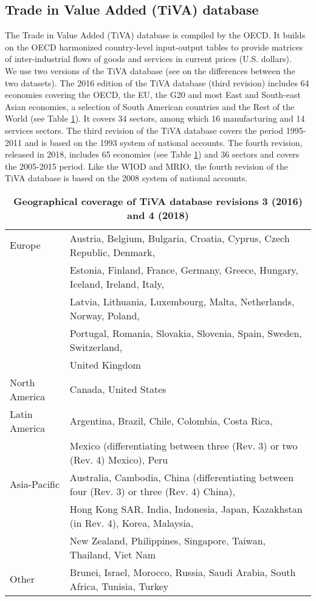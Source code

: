 \documentclass[11pt,a4paper]{paper} %
\begin{document}
\subsection{Trade in Value Added (TiVA) database}
The Trade in Value Added (TiVA) database is compiled by the OECD. 
It builds on the OECD harmonized country-level input-output tables to provide matrices of inter-industrial flows of goods and services in current prices (U.S. dollars).\\
We use two versions of the TiVA database (see \cite{OECD2018} on the differences between the two datasets).
The 2016 edition of the TiVA database (third revision) includes 64 economies covering the OECD, the EU, the G20 and most East and South-east Asian economies, a selection of South American countries and the Rest of the World (see Table \ref{tab:tiva}). It covers 34 sectors, among which 16 manufacturing and 14 services sectors. 
The third revision of the TiVA database covers the period 1995-2011 and is based on the 1993 system of national accounts.
The fourth revision, released in 2018, includes 65 economies (see Table \ref{tab:tiva}) and 36 sectors and covers the 2005-2015 period. 
Like the WIOD and MRIO, the fourth revision of the TiVA database is based on the 2008 system of national accounts.


\begin{table}[!h]
\begin{threeparttable}
\centering
\centering
\caption{\small{\textbf{Geographical coverage of TiVA database revisions 3 (2016) and 4 (2018)}}}
\small
\begin{tabular}{ll}
\hline\hline
Europe & Austria, Belgium, Bulgaria, Croatia, Cyprus, Czech Republic, Denmark,\\
& Estonia, Finland, France, Germany, Greece, Hungary, Iceland, Ireland, Italy,\\
& Latvia, Lithuania, Luxembourg, Malta, Netherlands, Norway, Poland,\\
&Portugal, Romania, Slovakia, Slovenia, Spain, Sweden, Switzerland,\\
& United Kingdom\\
North  America& Canada, United States\\
Latin America & Argentina, Brazil, Chile, Colombia, Costa Rica, \\ 
&Mexico (differentiating between three (Rev. 3) or two (Rev. 4) Mexico), Peru\\
Asia-Pacific & Australia, Cambodia, China (differentiating between four (Rev. 3) or three (Rev. 4) China), \\
& Hong Kong SAR, India, Indonesia, Japan, Kazakhstan (in Rev. 4), Korea, Malaysia, \\
& New Zealand, Philippines, Singapore, Taiwan, Thailand, Viet Nam\\
Other & Brunei, Israel, Morocco, Russia, Saudi Arabia, South Africa, Tunisia, Turkey\\
\hline\hline
\end{tabular} 
\label{tab:tiva}
\end{threeparttable}
\end{table} 
\end{document}
